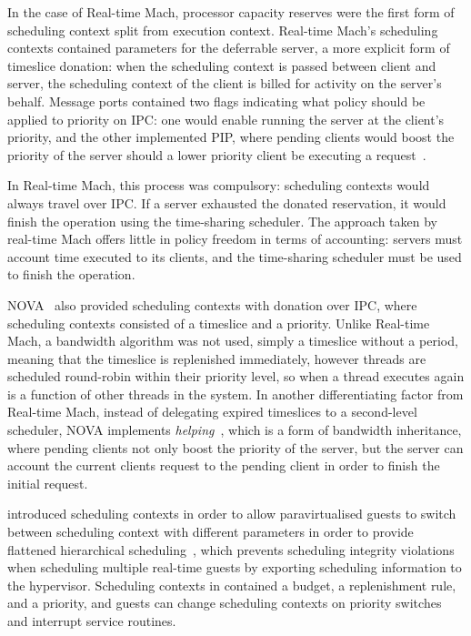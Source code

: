 In the case of Real-time Mach, processor capacity reserves were the first form of scheduling context
split from execution context. Real-time Mach's scheduling contexts contained parameters for the deferrable
server, a more explicit form of
timeslice donation: when the scheduling context is passed between client and server, the scheduling
context of the client is billed for activity on the server's behalf. 
Message ports contained two flags indicating what policy should be applied to priority on \gls{IPC}:
one would enable running the server at the client's priority, and the other implemented \gls{PIP},
where pending clients would boost the priority of the server should a lower priority client be
executing a request~\citep{Kitayama_NT_93}. 

In Real-time Mach, this process was
compulsory: scheduling contexts would always travel over \gls{IPC}.
If a server exhausted the
donated reservation, it would finish the operation using the time-sharing scheduler.  
The approach taken by real-time Mach offers little in policy freedom in terms of accounting: 
servers must account time executed to its clients, and the time-sharing scheduler must be used to
finish the operation.

NOVA~\citep{Steinberg_WH_05} also provided scheduling contexts with donation over \gls{IPC}, where
scheduling contexts consisted of a timeslice and a priority. Unlike Real-time Mach, a bandwidth
algorithm was not used, simply a timeslice without a period, meaning that the timeslice is
replenished immediately, however threads are scheduled round-robin within their priority level, so
when a thread executes again is a function of other threads in the system.  In another
differentiating factor from Real-time Mach, instead of delegating expired timeslices to a
second-level scheduler, NOVA implements \emph{helping}~\citep{Steinberg_BK_10}, which is a form of
bandwidth inheritance, where pending clients not only boost the priority of the server, but the
server can account the current clients request to the pending client in order to finish the initial request. 

\fiascooc introduced scheduling contexts in order to allow paravirtualised guests to switch between
scheduling context with different parameters in order to provide flattened hierarchical
scheduling~\citep{Lackorzynski_WVH_12}, which prevents scheduling integrity violations
when scheduling multiple real-time guests by exporting scheduling information to the hypervisor.
Scheduling contexts in \fiascooc contained a budget, a
replenishment rule, and a priority, and guests 
can change scheduling contexts on priority switches and interrupt service routines.

